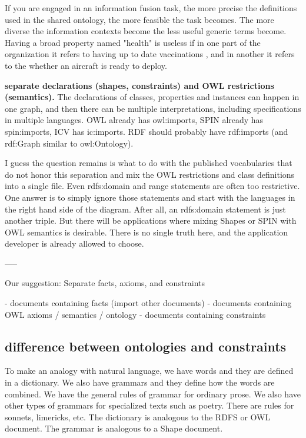 \documentclass{llncs}
\begin{document}
If you are engaged in an information fusion task, the more precise the definitions used in the shared ontology, the more feasible the task becomes.  The more diverse the information contexts become the less useful generic terms become.
Having a broad  property named "health" is useless if in one part of the organization it refers to having up to date vaccinations , and in another it refers to the whether an aircraft is ready to deploy.

\textbf{separate declarations (shapes, constraints) and OWL restrictions (semantics).}
The declarations of classes, properties and instances can happen in one graph, 
and then there can be 
multiple interpretations, including specifications in multiple 
languages. OWL already has owl:imports, SPIN already has spin:imports, 
ICV has ic:imports. RDF should probably have rdf:imports (and rdf:Graph 
similar to owl:Ontology).

I guess the question remains is what to do with the published 
vocabularies that do not honor this separation and mix the OWL 
restrictions and class definitions into a single file. Even rdfs:domain 
and range statements are often too restrictive. One answer is to simply 
ignore those statements and start with the languages in the right hand 
side of the diagram. After all, an rdfs:domain statement is just another 
triple. But there will be applications where mixing Shapes or SPIN with 
OWL semantics is desirable. There is no single truth here, and the 
application developer is already allowed to choose.


-----

Our suggestion:
Separate facts, axioms, and constraints

- documents containing facts (import other documents)
- documents containing OWL axioms / semantics / ontology
- documents containing constraints

\subsection{difference between ontologies and constraints}

To make an analogy with natural language, we have words and they are 
defined in a dictionary. We also have grammars and they define how the 
words are combined. We have the general rules of grammar for ordinary 
prose. We also have other types of grammars for specialized texts such as 
poetry. There are rules for sonnets, limericks, etc. The dictionary is 
analogous to the RDFS or OWL document. The grammar is analogous to a Shape 
document.
\end{document}
